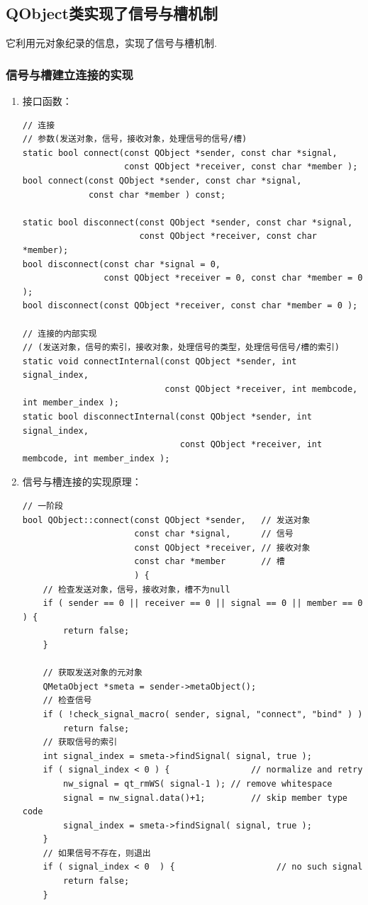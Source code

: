 \documentclass[9pt,b5paper]{article}
\begin{document}
\subsection{QObject类实现了信号与槽机制}
\label{sec-4-2}
它利用元对象纪录的信息，实现了信号与槽机制.
\subsubsection{信号与槽建立连接的实现}
\label{sec-4-2-1}
\begin{enumerate}
\item 接口函数：
\label{sec-4-2-1-1}
\lstset{language=c++,label= ,caption= ,numbers=none}
\begin{lstlisting}
// 连接  
// 参数(发送对象，信号，接收对象，处理信号的信号/槽)
static bool connect(const QObject *sender, const char *signal,  
                    const QObject *receiver, const char *member );  
bool connect(const QObject *sender, const char *signal,  
             const char *member ) const;

static bool disconnect(const QObject *sender, const char *signal,  
                       const QObject *receiver, const char *member);  
bool disconnect(const char *signal = 0,  
                const QObject *receiver = 0, const char *member = 0 );  
bool disconnect(const QObject *receiver, const char *member = 0 );

// 连接的内部实现  
// (发送对象，信号的索引，接收对象，处理信号的类型，处理信号信号/槽的索引)    
static void connectInternal(const QObject *sender, int signal_index,  
                            const QObject *receiver, int membcode, int member_index );  
static bool disconnectInternal(const QObject *sender, int signal_index,  
                               const QObject *receiver, int membcode, int member_index );
\end{lstlisting}
\item 信号与槽连接的实现原理：
\label{sec-4-2-1-2}
\lstset{language=c++,label= ,caption= ,numbers=none}
\begin{lstlisting}
// 一阶段  
bool QObject::connect(const QObject *sender,   // 发送对象        
                      const char *signal,      // 信号  
                      const QObject *receiver, // 接收对象  
                      const char *member       // 槽  
                      ) { 
    // 检查发送对象，信号，接收对象，槽不为null  
    if ( sender == 0 || receiver == 0 || signal == 0 || member == 0 ) {        
        return false;  
    }
    
    // 获取发送对象的元对象  
    QMetaObject *smeta = sender->metaObject();  
    // 检查信号  
    if ( !check_signal_macro( sender, signal, "connect", "bind" ) )  
        return false;     
    // 获取信号的索引  
    int signal_index = smeta->findSignal( signal, true );  
    if ( signal_index < 0 ) {                // normalize and retry  
        nw_signal = qt_rmWS( signal-1 ); // remove whitespace  
        signal = nw_signal.data()+1;         // skip member type code  
        signal_index = smeta->findSignal( signal, true );  
    }  
    // 如果信号不存在，则退出  
    if ( signal_index < 0  ) {                    // no such signal  
        return false;  
    }  


\end{lstlisting}
\end{enumerate}
\end{document}
